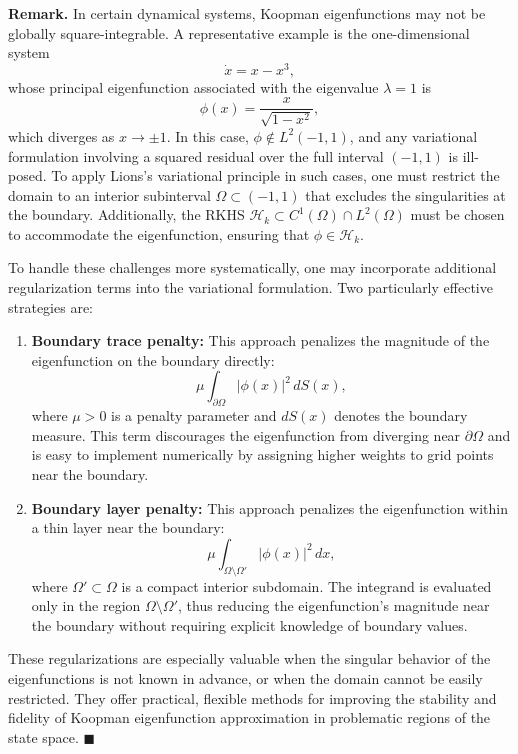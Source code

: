 \documentclass[11pt]{article}
\theoremstyle{plain}
\newenvironment{remark}
  {\par\noindent\textbf{Remark. }\normalfont}
  {\hfill$\blacksquare$\par}
\def\[{\begin{equation}}
\def\]{\end{equation}}
\begin{document}
\begin{remark}[Domain Selection and Eigenfunction Behavior]
In certain dynamical systems, Koopman eigenfunctions may not be globally square-integrable. A representative example is the one-dimensional system
\[
\dot{x} = x - x^3,
\]
whose principal eigenfunction associated with the eigenvalue \( \lambda = 1 \) is
\[
\phi(x) = \frac{x}{\sqrt{1 - x^2}},
\]
which diverges as \( x \to \pm 1 \). In this case, \( \phi \notin L^2(-1,1) \), and any variational formulation involving a squared residual over the full interval \( (-1,1) \) is ill-posed. To apply Lions's variational principle in such cases, one must restrict the domain to an interior subinterval \( \Omega \subset (-1, 1) \) that excludes the singularities at the boundary. Additionally, the RKHS \( \mathcal{H}_k \subset C^1(\Omega) \cap L^2(\Omega) \) must be chosen to accommodate the eigenfunction, ensuring that \( \phi \in \mathcal{H}_k \).

\medskip

To handle these challenges more systematically, one may incorporate additional regularization terms into the variational formulation. Two particularly effective strategies are:

\begin{enumerate}
    \item \textbf{Boundary trace penalty:} This approach penalizes the magnitude of the eigenfunction on the boundary directly:
    \[
    \mu \int_{\partial \Omega} |\phi(x)|^2 \, dS(x),
    \]
    where \( \mu > 0 \) is a penalty parameter and \( dS(x) \) denotes the boundary measure. This term discourages the eigenfunction from diverging near \( \partial \Omega \) and is easy to implement numerically by assigning higher weights to grid points near the boundary.
    
    \item \textbf{Boundary layer penalty:} This approach penalizes the eigenfunction within a thin layer near the boundary:
    \[
    \mu \int_{\Omega \setminus \Omega'} |\phi(x)|^2 \, dx,
    \]
    where \( \Omega' \subset \Omega \) is a compact interior subdomain. The integrand is evaluated only in the region \( \Omega \setminus \Omega' \), thus reducing the eigenfunction's magnitude near the boundary without requiring explicit knowledge of boundary values.
\end{enumerate}

These regularizations are especially valuable when the singular behavior of the eigenfunctions is not known in advance, or when the domain cannot be easily restricted. They offer practical, flexible methods for improving the stability and fidelity of Koopman eigenfunction approximation in problematic regions of the state space.
\end{remark}
\end{document}
